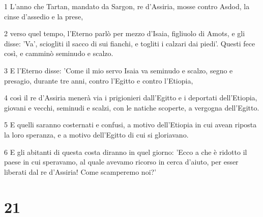 \par 1 L'anno che Tartan, mandato da Sargon, re d'Assiria, mosse contro Asdod, la cinse d'assedio e la prese,
\par 2 verso quel tempo, l'Eterno parlò per mezzo d'Isaia, figliuolo di Amots, e gli disse: 'Va', sciogliti il sacco di sui fianchi, e togliti i calzari dai piedi'. Questi fece così, e camminò seminudo e scalzo.
\par 3 E l'Eterno disse: 'Come il mio servo Isaia va seminudo e scalzo, segno e presagio, durante tre anni, contro l'Egitto e contro l'Etiopia,
\par 4 così il re d'Assiria menerà via i prigionieri dall'Egitto e i deportati dell'Etiopia, giovani e vecchi, seminudi e scalzi, con le natiche scoperte, a vergogna dell'Egitto.
\par 5 E quelli saranno costernati e confusi, a motivo dell'Etiopia in cui avean riposta la loro speranza, e a motivo dell'Egitto di cui si gloriavano.
\par 6 E gli abitanti di questa costa diranno in quel giorno: 'Ecco a che è ridotto il paese in cui speravamo, al quale avevamo ricorso in cerca d'aiuto, per esser liberati dal re d'Assiria! Come scamperemo noi?'

\chapter{21}

